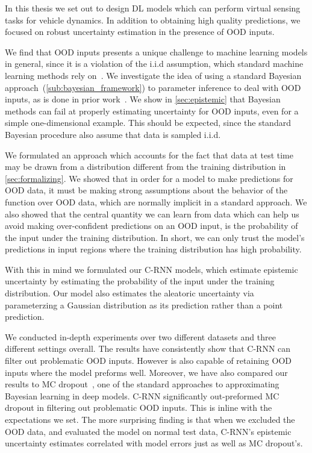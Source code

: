 \documentclass[../main.tex]{subfiles}
\begin{document}
In this thesis we set out to design DL models which can perform virtual sensing tasks for vehicle dynamics. In addition to obtaining high quality predictions, we focused on robust uncertainty  estimation in the presence of OOD inputs. 

We find that OOD inputs presents a unique challenge to machine learning models in general, since it is a violation of the i.i.d assumption, which standard machine learning methods rely on~\citep{goodfellow2016deep}. We investigate the idea of using a standard Bayesian approach~(\cref{sub:bayesian_framework}) to parameter inference to deal with OOD inputs, as is done in prior work~\citep{kendall2017uncertainties}. We show in \cref{sec:epistemic} that Bayesian methods can fail at properly estimating uncertainty for OOD inputs, even for a simple one-dimensional example. This should be expected, since the standard Bayesian procedure also assume that data is sampled i.i.d. 

We formulated an approach which accounts for the fact that data at test time may be drawn from a distribution different from the training distribution in \cref{sec:formalizing}. We showed that in order for a model to make predictions for OOD data, it must be making strong assumptions about the behavior of the function over OOD data, which are normally implicit in a standard approach. We also showed that the central quantity we can learn from data which can help us avoid making over-confident predictions on an OOD input, is the probability of the input under the training distribution. In short, we can only trust the model's predictions in input regions where the training distribution has high probability. 

With this in mind we formulated our C-RNN models, which estimate epistemic uncertainty by estimating the probability of the input under the training distribution. Our model also estimates the aleatoric uncertainty via parameterzing a Gaussian distribution as its prediction rather than a point prediction.

We conducted in-depth experiments over two different datasets and three different settings overall. The results have consistently show that C-RNN can filter out problematic OOD inputs. However is also capable of retaining OOD inputs where the model preforms well. Moreover, we have also compared our results to MC dropout~\citep{gal2016dropout}, one of the standard approaches to approximating Bayesian learning in deep models. C-RNN significantly out-preformed MC dropout in filtering out problematic OOD inputs. This is inline with the expectations we set. The more surprising finding is that when we excluded the OOD data, and evaluated the model on normal test data, C-RNN's epistemic uncertainty estimates correlated with model errors just as well as MC dropout's. 
\end{document}
